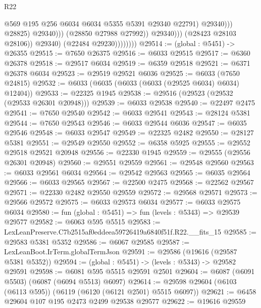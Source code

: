 \begin{lexlean}{R22}
\begin{coremodule}
                                              @569
                                              @195
                                              @256
                                              @6034
                                              @6034
                                              @5355
                                              @5391
                                              @29340
                                              @22791)
                                            @29340)))
                                      @28825)
                                    @29340)))
                              (@28850 @27988 @27992))
                            @29340)))
                      (@28423 @28103 @28106))
                    @29340)
                  (@22484 @29230))))))))
@29514 := (global : @5451) -> @26355
@29515 := @7650 @26375
@29516 := @6033 @29515
@29517 := @6360 @26378
@29518 := @29517 @6034
@29519 := @6359 @29518
@29521 := @6371 @26378 @6034
@29523 := @29519 @29521 @6036
@29525 := @6033 (@7650 @24815)
@29532 := @6033 (@6035 (@6033 (@6033 (@29525 @6034) @6034) @12404))
@29533 := @22325 @1945
@29538 := @29516 (@29523 (@29532 (@29533 @26301 @20948)))
@29539 := @6033 @29538
@29540 := @22497 @2475
@29541 := @7650 @29540
@29542 := @6033 @29541
@29543 := @28124 @5381
@29544 := @7650 @29543
@29546 := @6033 @29544 @6036
@29547 := @6035 @29546
@29548 := @6033 @29547
@29549 := @22325 @2482
@29550 := @28127 @5381
@29551 := @29549 @29550
@29552 := @6358 @5925
@29555 := @29552 @29518 @29521 @20948
@29556 := @22330 @1945
@29559 := @29555 (@29556 @26301 @20948)
@29560 := @29551 @29559
@29561 := @29548 @29560
@29563 := @6033 @29561 @6034
@29564 := @29542 @29563
@29565 := @6035 @29564
@29566 := @6033 @29565
@29567 := @22500 @2475
@29568 := @22562 @29567
@29571 := @22330 @2482 @29550 @29559
@29572 := @29568 @29571
@29573 := @29566 @29572
@29575 := @6033 @29573 @6034
@29577 := @6033 @29575 @6034
@29580 := fun (global : @5451) => fun (levels : @5343) => @29539 @29577
@29582 := @6063 @595 @5515
@29583 := LexLeanPreserve.C7b2515af0eddeea59726419a6840f51f.R22.__fits_15
@29585 := @29583 @5381 @5352
@29586 := @6067 @29585
@29587 := LexLeanBoot.IrTerm.globalTermJson
@29591 := @29586 (@19616 (@29587 @5381 @5352))
@29594 := (global : @5451) -> (levels : @5343) -> @29582 @29591
@29598 := @6081 @595 @5515 @29591 @2501
@29604 := @6087 (@6091 @5503) (@6087 (@6094 @5513) @6097)
@29614 := @29598 @29604 (@6103 (@6113 @595)) (@6119 (@6120 (@6121 @2501) @5515 @6097))
@29621 := @6458 @29604 @107 @195 @2473 @2499 @29538 @29577
@29622 := @19616 @29559

\end{coremodule}
\end{lexlean}
